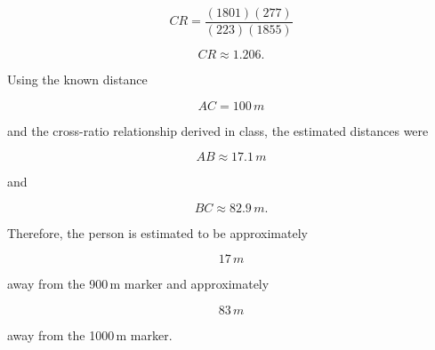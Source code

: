 \begin{enumerate}
\begin{studentSpace}
\[
CR
=
\frac{(1801)(277)}
     {(223)(1855)}
\]

\[
CR
\approx 1.206.
\]

Using the known distance

\[
AC = 100\,m
\]

and the cross-ratio relationship derived in class, the estimated distances were

\[
AB \approx 17.1\,m
\]

and

\[
BC \approx 82.9\,m.
\]

Therefore, the person is estimated to be approximately

\[
17\,m
\]

away from the 900\,m marker and approximately

\[
83\,m
\]

away from the 1000\,m marker.

\end{studentSpace}


\end{enumerate}
